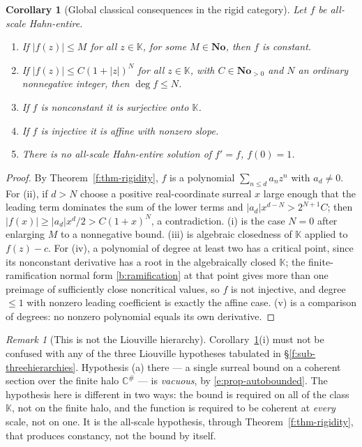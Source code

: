 \documentclass[11pt,a4paper]{article}
\numberwithin{equation}{section}
\newtheorem{corollary}[theorem]{Corollary}
\theoremstyle{definition}
\theoremstyle{remark}
\newtheorem{remark}[theorem]{Remark}
\theoremstyle{plain}
\newcommand{\K}{\mathbb K}
\newcommand{\No}{\mathbf{No}}
\newcommand{\CC}{\mathbb C}
\newcommand{\halo}[1]{#1^{\#}}
\newcommand{\abs}[1]{\lvert #1\rvert}
\begin{document}
\begin{corollary}[Global classical consequences in the rigid
category]\label{f:cor-globalclassical}
Let $f$ be all-scale Hahn-entire.
\begin{enumerate}[label=\textup{(\roman*)},leftmargin=2.4em]
\item If $\abs{f(z)}\le M$ for all $z\in\K$, for some $M\in\No$, then
 $f$ is constant.
\item If $\abs{f(z)}\le C(1+\abs z)^{N}$ for all $z\in\K$, with
 $C\in\No_{>0}$ and $N$ an ordinary nonnegative integer, then
 $\deg f\le N$.
\item If $f$ is nonconstant it is surjective onto $\K$.
\item If $f$ is injective it is affine with nonzero slope.
\item There is no all-scale Hahn-entire solution of $f'=f$, $f(0)=1$.
\end{enumerate}
\end{corollary}

\begin{proof}
By Theorem~\ref{f:thm-rigidity}, $f$ is a polynomial
$\sum_{n\le d}a_{n}z^{n}$ with $a_{d}\ne0$.  For (ii), if $d>N$ choose a
positive real-coordinate surreal $x$ large enough that the leading term
dominates the sum of the lower terms and $\abs{a_{d}}x^{d-N}>2^{N+1}C$;
then $\abs{f(x)}\ge\abs{a_{d}}x^{d}/2>C(1+x)^{N}$, a contradiction.
(i) is the case $N=0$ after enlarging $M$ to a nonnegative bound.
(iii) is algebraic closedness of $\K$ applied to $f(z)-c$.  For (iv), a
polynomial of degree at least two has a critical point, since its
nonconstant derivative has a root in the algebraically closed $\K$; the
finite-ramification normal form \ref{b:ramification} at that point
gives more than one preimage of sufficiently close noncritical values,
so $f$ is not injective, and degree $\le1$ with nonzero leading
coefficient is exactly the affine case.  (v) is a comparison of degrees:
no nonzero polynomial equals its own derivative.
\end{proof}

\begin{remark}[This is not the Liouville hierarchy]\label{f:rem-notliouville}
Corollary~\ref{f:cor-globalclassical}(i) must not be confused with any
of the three Liouville hypotheses tabulated in
\S\ref{f:sub-threehierarchies}.  Hypothesis (a) there --- a single surreal bound on a coherent
section over the finite halo $\halo\CC$ --- is \emph{vacuous}, by
\ref{e:prop-autobounded}.  The hypothesis here is different in two ways:
the bound is required on all of the class $\K$, not on the finite halo,
and the function is required to be coherent at \emph{every} scale, not
on one.  It is the all-scale hypothesis, through
Theorem~\ref{f:thm-rigidity}, that produces constancy, not the bound by
itself.
\end{remark}
\end{document}
